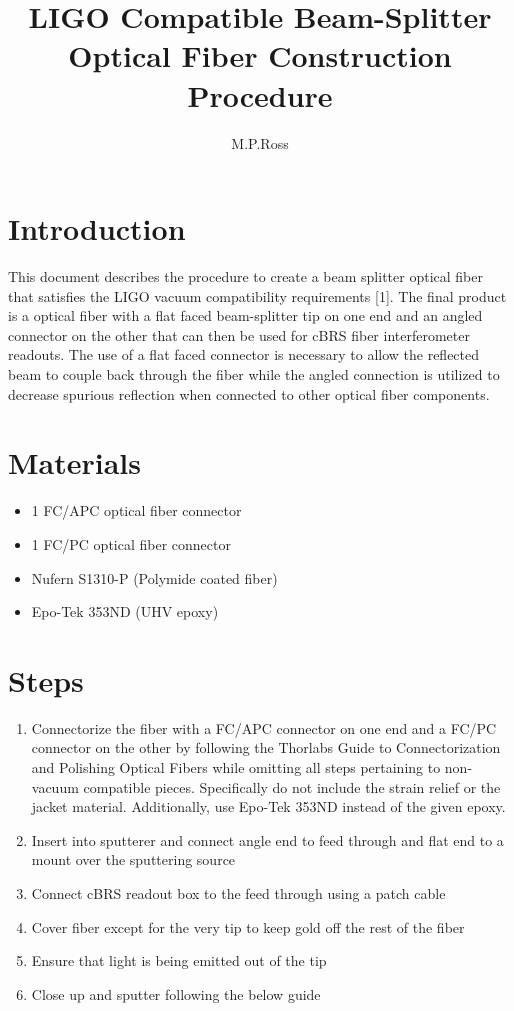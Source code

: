 \documentclass{article}
\title{LIGO Compatible Beam-Splitter Optical Fiber Construction Procedure}
\author{M.P.Ross}
\begin{document}
\maketitle
\section{Introduction}
This document describes the procedure to create a beam splitter optical fiber that satisfies the LIGO vacuum compatibility requirements [1]. The final product is a optical fiber with a flat faced beam-splitter tip on one end and an angled connector on the other that can then be used for cBRS fiber interferometer readouts. The use of a flat faced connector is necessary to allow the reflected beam to couple back through the fiber while the angled connection is utilized to decrease spurious reflection when connected to other optical fiber components.
\section{Materials}
\begin{itemize}
\item 1 FC/APC optical fiber connector
\item 1 FC/PC optical fiber connector
\item Nufern S1310-P (Polymide coated fiber)
\item Epo-Tek 353ND (UHV epoxy)
\end{itemize}
\section{Steps}
\begin{enumerate}
\item Connectorize the fiber with a FC/APC connector on one end and a FC/PC connector on the other by following the Thorlabs Guide to Connectorization and Polishing Optical Fibers while omitting all steps pertaining to non-vacuum compatible pieces. Specifically do not include the strain relief or the jacket material. Additionally, use Epo-Tek 353ND instead of the given epoxy.
\item Insert into sputterer and connect angle end to feed through and flat end to a mount over the sputtering source
\item Connect cBRS readout box to the feed through using a patch cable
\item Cover fiber except for the very tip to keep gold off the rest of the fiber
\item Ensure that light is being emitted out of the tip
\item Close up and sputter following the below guide
\end{enumerate}
\end{document}
